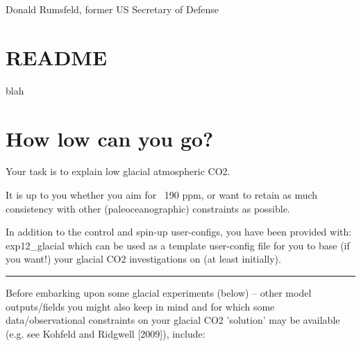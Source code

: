\documentclass[11pt,fleqn]{book} %
\begin{document}
\hfill \break
\noindent Donald Rumsfeld, former US Secretary of Defense


\newpage


\section{README}

blah


\newpage


\section{How low can you go?}

Your task is to explain low glacial atmospheric CO2.

It is up to you whether you aim for ~190 ppm, or want to retain as much consistency with other (paleoceanographic) constraints as possible.

In addition to the control and spin-up user-configs, you have been provided with: exp12\_glacial which can be used as a template user-config file for you to base (if you want!) your glacial CO2 investigations on (at least initially).

\vspace{1mm}
\noindent\rule{4cm}{0.5pt}
\vspace{2mm}

Before embarking upon some glacial experiments (below) – other model outputs/fields you might
also keep in mind and for which some data/observational constraints on your glacial CO2 'solution'
may be available (e.g. see Kohfeld and Ridgwell [2009]), include:
\end{document}
